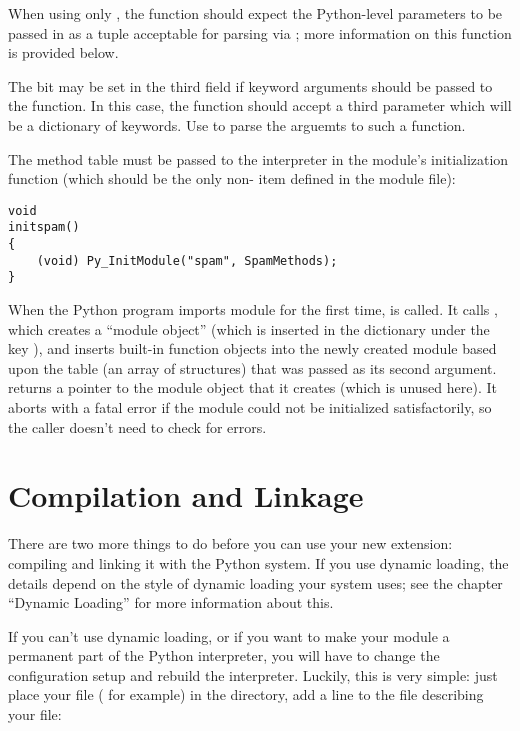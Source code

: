 \documentclass{manual}
\begin{document}
When using only , the function should expect
the Python-level parameters to be passed in as a tuple acceptable for
parsing via ; more information on this
function is provided below.

The  bit may be set in the third field if keyword
arguments should be passed to the function.  In this case, the \C{}
function should accept a third  parameter which will
be a dictionary of keywords.  Use 
to parse the arguemts to such a function.

The method table must be passed to the interpreter in the module's
initialization function (which should be the only non-
item defined in the module file):

\begin{verbatim}
void
initspam()
{
    (void) Py_InitModule("spam", SpamMethods);
}
\end{verbatim}

When the Python program imports module  for the first
time,  is called.  It calls
, which creates a ``module object'' (which
is inserted in the dictionary  under the key
), and inserts built-in function objects into the newly
created module based upon the table (an array of 
structures) that was passed as its second argument.
 returns a pointer to the module object
that it creates (which is unused here).  It aborts with a fatal error
if the module could not be initialized satisfactorily, so the caller
doesn't need to check for errors.


\section{Compilation and Linkage}
\label{compilation}

There are two more things to do before you can use your new extension:
compiling and linking it with the Python system.  If you use dynamic
loading, the details depend on the style of dynamic loading your
system uses; see the chapter ``Dynamic Loading'' for more information
about this.

If you can't use dynamic loading, or if you want to make your module a
permanent part of the Python interpreter, you will have to change the
configuration setup and rebuild the interpreter.  Luckily, this is
very simple: just place your file ( for example) in
the  directory, add a line to the file
 describing your file:
\end{document}
